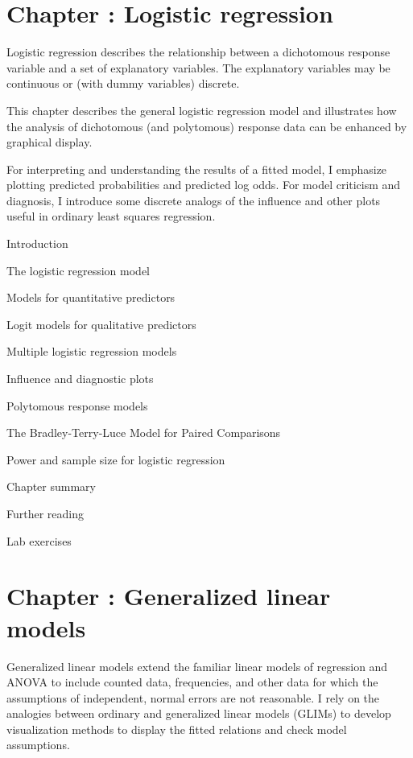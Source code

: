 \documentclass{article}
\newcommand{\Chapter}[1]{\section{Chapter \thesection: #1}}
\newcommand{\Section}[1]{\item #1}
\begin{document}
\Chapter{Logistic regression}\label{ch:logistic}

Logistic regression describes the relationship between a
dichotomous response variable and a set of explanatory variables.
The explanatory variables may be continuous or (with dummy variables)
discrete.

This chapter describes the general logistic regression model
and illustrates how the analysis of dichotomous (and polytomous)
response data can be enhanced by graphical display.

For interpreting and understanding the results of a fitted model,
I emphasize plotting predicted probabilities and predicted log odds.
For model criticism and diagnosis, I introduce some discrete
analogs of the influence and other plots useful in ordinary least
squares regression.
\begin{enumerate*}
  \Section{Introduction}
  \Section{The logistic regression model}\label{sec:logist-model}
  \Section{Models for quantitative predictors}\label{sec:logist-quant}
  \Section{Logit models for qualitative predictors}\label{sec:logist-qual}
  \Section{Multiple logistic regression models}\label{sec:logist-mult}
  \Section{Influence and diagnostic plots}\label{sec:logist-infl}
  \Section{Polytomous response models}\label{sec:logist-poly}
  \Section{The Bradley-Terry-Luce Model for Paired Comparisons}\label{sec:logist-btl}
  \Section{Power and sample size for logistic regression} \label{sec:logistic-power}
  \Section{Chapter summary}
  \Section{Further reading}
  \Section{Lab exercises}
\end{enumerate*}

\Chapter{Generalized linear models}\label{ch:glim}

Generalized linear models extend the familiar linear models of
regression and ANOVA to
include counted data, frequencies, and other data for which the
assumptions of independent, normal errors are not reasonable.
I rely on the analogies between ordinary and generalized linear
models (GLIMs) to develop visualization methods to display the fitted
relations and check model assumptions.
\end{document}
